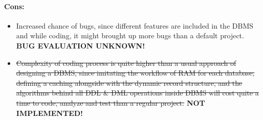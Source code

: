 \documentclass[12pt]{report}
\begin{document}
\paragraph{Cons:}
\begin{itemize}
\item Increased chance of bugs, since different features are included in the DBMS and while coding, it might brought up more bugs than a default project. \textbf{BUG EVALUATION UNKNOWN!}
\item \sout{Complexity of coding process is quite higher than a usual approach of designing a DBMS, since imitating the workflow of RAM for each database, defining a caching alongside with the dynamic record structure, and the algorithms behind all DDL \& DML operations inside DBMS will cost quite a time to code, analyze and test than a regular project. }\textbf{NOT IMPLEMENTED!}
\end{itemize}
\end{document}

